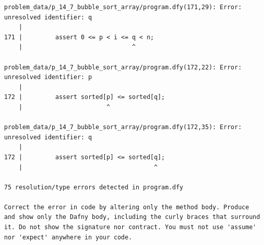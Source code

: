 \documentclass{article}
\begin{document}
\begin{lstlisting}
problem_data/p_14_7_bubble_sort_array/program.dfy(171,29): Error: unresolved identifier: q
    |
171 |         assert 0 <= p < i <= q < n;
    |                              ^

problem_data/p_14_7_bubble_sort_array/program.dfy(172,22): Error: unresolved identifier: p
    |
172 |         assert sorted[p] <= sorted[q];
    |                       ^

problem_data/p_14_7_bubble_sort_array/program.dfy(172,35): Error: unresolved identifier: q
    |
172 |         assert sorted[p] <= sorted[q];
    |                                    ^

75 resolution/type errors detected in program.dfy

Correct the error in code by altering only the method body. Produce and show only the Dafny body, including the curly braces that surround it. Do not show the signature nor contract. You must not use 'assume' nor 'expect' anywhere in your code.
\end{lstlisting}
\end{document}
